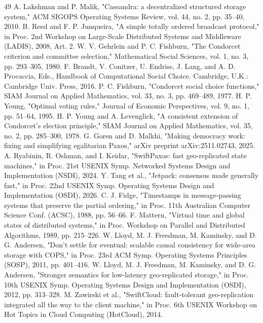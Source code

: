 \documentclass[11pt]{article}
\begin{document}
\begin{thebibliography}{49}
 A. Lakshman and P. Malik, "Cassandra: a decentralized structured storage system," ACM SIGOPS Operating Systems Review, vol. 44, no. 2, pp. 35–40, 2010.
 B. Reed and F. P. Junqueira, "A simple totally ordered broadcast protocol," in Proc. 2nd Workshop on Large-Scale Distributed Systems and Middleware (LADIS), 2008, Art. 2.
 W. V. Gehrlein and P. C. Fishburn, "The Condorcet criterion and committee selection," Mathematical Social Sciences, vol. 1, no. 3, pp. 293–305, 1980.
 F. Brandt, V. Conitzer, U. Endriss, J. Lang, and A. D. Procaccia, Eds., Handbook of Computational Social Choice. Cambridge, U.K.: Cambridge Univ. Press, 2016.
 P. C. Fishburn, "Condorcet social choice functions," SIAM Journal on Applied Mathematics, vol. 33, no. 3, pp. 469–489, 1977.
 H. P. Young, "Optimal voting rules," Journal of Economic Perspectives, vol. 9, no. 1, pp. 51–64, 1995.
 H. P. Young and A. Levenglick, "A consistent extension of Condorcet's election principle," SIAM Journal on Applied Mathematics, vol. 35, no. 2, pp. 285–300, 1978.
 G. Goren and D. Malkhi, "Making democracy work: fixing and simplifying egalitarian Paxos," arXiv preprint arXiv:2511.02743, 2025.
 A. Ryabinin, R. Oshman, and I. Keidar, "SwiftPaxos: fast geo-replicated state machines," in Proc. 21st USENIX Symp. Networked Systems Design and Implementation (NSDI), 2024.
 Y. Tang et al., "Jetpack: consensus made generally fast," in Proc. 22nd USENIX Symp. Operating Systems Design and Implementation (OSDI), 2026.
 C. J. Fidge, "Timestamps in message-passing systems that preserve the partial ordering," in Proc. 11th Australian Computer Science Conf. (ACSC), 1988, pp. 56–66.
 F. Mattern, "Virtual time and global states of distributed systems," in Proc. Workshop on Parallel and Distributed Algorithms, 1989, pp. 215–226.
 W. Lloyd, M. J. Freedman, M. Kaminsky, and D. G. Andersen, "Don't settle for eventual: scalable causal consistency for wide-area storage with COPS," in Proc. 23rd ACM Symp. Operating Systems Principles (SOSP), 2011, pp. 401–416.
 W. Lloyd, M. J. Freedman, M. Kaminsky, and D. G. Andersen, "Stronger semantics for low-latency geo-replicated storage," in Proc. 10th USENIX Symp. Operating Systems Design and Implementation (OSDI), 2012, pp. 313–328.
 M. Zawirski et al., "SwiftCloud: fault-tolerant geo-replication integrated all the way to the client machine," in Proc. 6th USENIX Workshop on Hot Topics in Cloud Computing (HotCloud), 2014.

\end{thebibliography}
\end{document}
